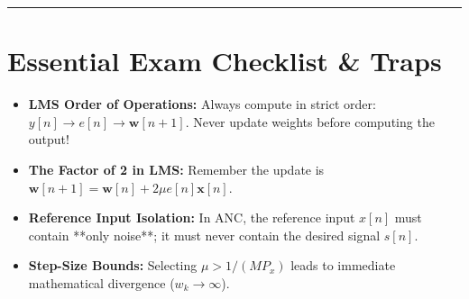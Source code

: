 \documentclass[11pt,a4paper]{article}
\begin{document}
\noindent\rule{\textwidth}{0.5pt}

\section{Essential Exam Checklist \& Traps}
\begin{itemize}
    \item[$\square$] \textbf{LMS Order of Operations:} Always compute in strict order: $y[n] \to e[n] \to \mathbf{w}[n+1]$. Never update weights before computing the output!
    \item[$\square$] \textbf{The Factor of 2 in LMS:} Remember the update is $\mathbf{w}[n+1] = \mathbf{w}[n] + 2\mu e[n]\mathbf{x}[n]$.
    \item[$\square$] \textbf{Reference Input Isolation:} In ANC, the reference input $x[n]$ must contain **only noise**; it must never contain the desired signal $s[n]$.
    \item[$\square$] \textbf{Step-Size Bounds:} Selecting $\mu > 1/(M P_x)$ leads to immediate mathematical divergence ($w_k \to \infty$).
\end{itemize}
\end{document}
